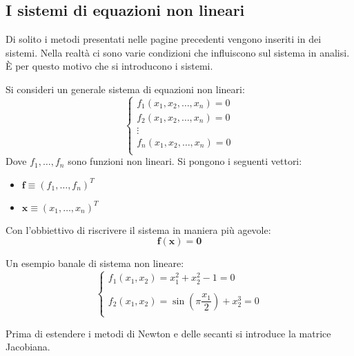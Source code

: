 \subsection{I sistemi di equazioni non lineari}

Di solito i metodi presentati nelle pagine precedenti vengono inseriti in dei sistemi. Nella realtà ci sono varie condizioni che influiscono sul sistema in analisi. È per questo motivo che si introducono i sistemi.

\highspace
Si consideri un generale sistema di equazioni non lineari:
\begin{equation*}
    \begin{cases}
        f_{1}\left(x_{1}, x_{2}, \dots, x_{n}\right) = 0 \\
        f_{2}\left(x_{1}, x_{2}, \dots, x_{n}\right) = 0 \\
        \vdots \\
        f_{n}\left(x_{1}, x_{2}, \dots, x_{n}\right) = 0 \\
    \end{cases}
\end{equation*}
Dove $f_{1}, \dots, f_{n}$ sono funzioni non lineari. Si pongono i seguenti vettori:
\begin{itemize}
    \item $\mathbf{f} \equiv \left(f_{1}, \dots, f_{n}\right)^{T}$
    \item $\mathbf{x} \equiv \left(x_{1}, \dots, x_{n}\right)^{T}$
\end{itemize}
Con l'obbiettivo di riscrivere il sistema in maniera più agevole:
\begin{equation*}
    \mathbf{f}\left(\mathbf{x}\right) = \mathbf{0}
\end{equation*}
\begin{examplebox}
    Un esempio banale di sistema non lineare:
    \begin{equation*}
        \begin{cases}
            f_{1}\left(x_{1}, x_{2}\right) = x_{1}^{2} + x_{2}^{2} - 1 = 0 \\
            \\
            f_{2}\left(x_{1}, x_{2}\right) = \sin\left(\pi \dfrac{x_{1}}{2}\right) + x_{2}^{3} = 0 \\
        \end{cases}
    \end{equation*}
\end{examplebox}

\noindent
Prima di estendere i metodi di Newton e delle secanti si introduce la matrice Jacobiana. 

